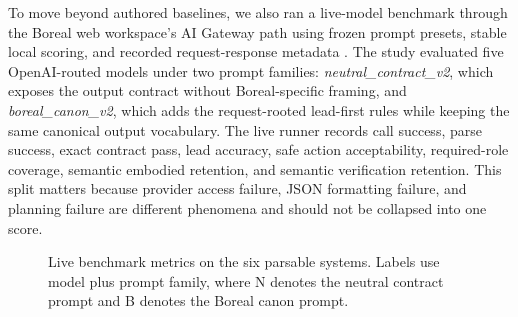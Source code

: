 

To move beyond authored baselines, we also ran a live-model benchmark through the Boreal web workspace's AI Gateway path using frozen prompt presets, stable local scoring, and recorded request-response metadata \cite{boreal_request_live_benchmark_runner_2026,boreal_request_live_benchmark_results_2026}. The study evaluated five OpenAI-routed models under two prompt families: \emph{neutral\_contract\_v2}, which exposes the output contract without Boreal-specific framing, and \emph{boreal\_canon\_v2}, which adds the request-rooted lead-first rules while keeping the same canonical output vocabulary. The live runner records call success, parse success, exact contract pass, lead accuracy, safe action acceptability, required-role coverage, semantic embodied retention, and semantic verification retention. This split matters because provider access failure, JSON formatting failure, and planning failure are different phenomena and should not be collapsed into one score.



\begin{figure}[t]
\centering
{}
\caption{Live benchmark metrics on the six parsable systems. Labels use model plus prompt family, where N denotes the neutral contract prompt and B denotes the Boreal canon prompt.}
\label{fig:live-normalization-gap}
\end{figure}

